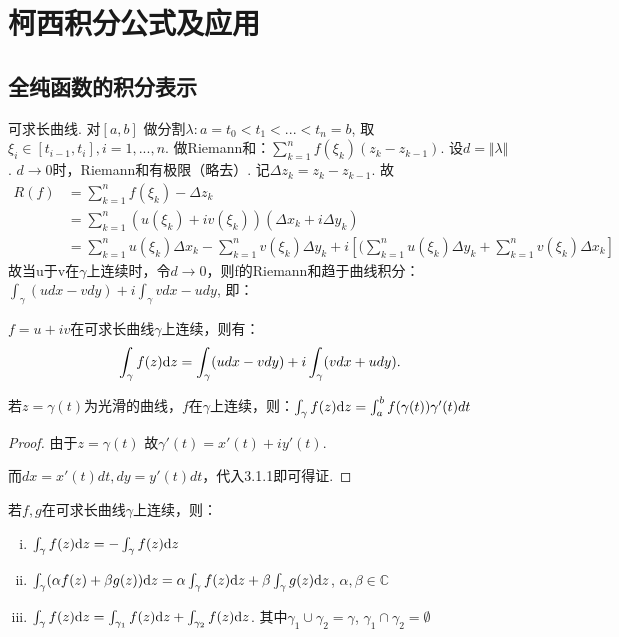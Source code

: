 \chapter{柯西积分公式及应用}

\section{全纯函数的积分表示}
可求长曲线. 对$[a,b]$ 做分割$\lambda : a = t_0 < t_1 < ... < t_n = b$, 取$\xi_i \in [t_{i-1}, t_i], i=1,...,n$.
做Riemann和：$\sum_{k=1} ^{n} f(\xi_k) (z_k - z_{k-1})$. 设$d=\Vert  \lambda \Vert$. $d \rightarrow 0$时，Riemann和有极限（略去）. 记$\Delta z_k = z_k - z_{k-1}$. 故
\begin{align*}
R(f) &= \sum_{k=1}^{n}f(\xi_k) - \Delta z_k \\
&= \sum_{k=1}^{n} (u(\xi_k) + i v(\xi_k))(\Delta x_k + i \Delta y_k) \\
&= \sum_{k=1} ^{n} u(\xi_k) \Delta x_k - \sum_{k=1}^{n} v(\xi_k) \Delta y_k + i [(\sum_{k=1}^{n} u(\xi_k) \Delta y_k + \sum_{k=1}^n v(\xi_k) \Delta x_k]
\end{align*}
故当u于v在$\gamma$上连续时，令$d \rightarrow 0$，则f的Riemann和趋于曲线积分：$\int_{\gamma} (udx - vdy) + i \int_{\gamma}vdx-udy$, 即： 
\begin{mypro}
	$f = u+iv$在可求长曲线$\gamma$上连续，则有：
	$$\int_\gamma f(z) \mathrm{d}z = \int_\gamma (udx-vdy) + i\int_\gamma (vdx+udy).$$
\end{mypro}
\begin{mypro}
	若$z=\gamma(t)$为光滑的曲线，$f$在$\gamma$上连续，则：$\int_\gamma f(z)\mathrm{d}z = \int_a^b f(\gamma(t))\gamma'(t) dt$
\end{mypro}
\begin{proof}
	由于$z=\gamma(t)$ 故$\gamma'(t)=x'(t) + i y'(t)$.
	
	而$dx=x'(t)dt, dy = y'(t)dt$，代入3.1.1即可得证.
\end{proof}

\begin{mypro}
	若$f, g$在可求长曲线$\gamma$上连续，则：
	\begin{enumerate}[i)]
		\item $\int_\gamma f(z)\mathrm{d}z = -\int_\gamma f(z)\mathrm{d}z$
		\item $\int_\gamma (\alpha f(z) + \beta g(z)) \mathrm{d}z = \alpha \int_\gamma f(z) \mathrm{d}z + \beta \int_\gamma g(z) \mathrm{d}z$, \quad $\alpha, \beta \in \mathbb{C}$
		\item $\int_\gamma f(z) \mathrm{d}z = \int_{\gamma_1} f(z) \mathrm{d}z + \int_{\gamma_2} f(z) \mathrm{d}z$. 其中$\gamma_1 \cup \gamma_2 = \gamma$, $\gamma_1 \cap \gamma_2 = \emptyset $
	\end{enumerate}
\end{mypro}

